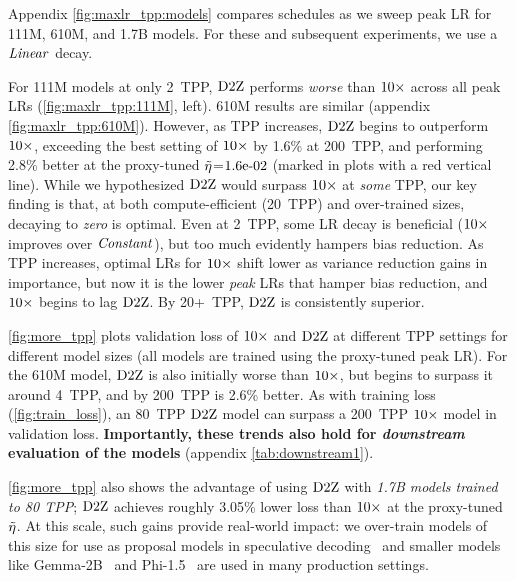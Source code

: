 Appendix \cref{fig:maxlr_tpp:models} compares schedules as we sweep
peak LR for 111M, 610M, and 1.7B models.  For these and subsequent
experiments, we use a $\mbox{\emph{Linear}}$ decay.



%


For 111M models at only 2~TPP, $\mbox{D2Z}$ performs \emph{worse} than
$\mbox{10}\times$ across all peak LRs (\cref{fig:maxlr_tpp:111M}, left).  610M
results are similar (appendix \cref{fig:maxlr_tpp:610M}).  However, as
TPP increases, $\mbox{D2Z}$ begins to outperform $\mbox{10}\times$, exceeding the
best setting of $\mbox{10}\times$ by 1.6\% at 200~TPP, and performing 2.8\%
better at the proxy-tuned $\tilde{\eta}$=$1.6\mbox{e-}02$ (marked in plots with a
red vertical line).
%
While we hypothesized $\mbox{D2Z}$ would surpass $\mbox{10}\times$ at \emph{some}
TPP, our key finding is that, at both compute-efficient (20~TPP) and
over-trained sizes, decaying to \emph{zero} is optimal.
%
Even at 2~TPP, some LR decay is beneficial ($\mbox{10}\times$ improves over
$\mbox{\emph{Constant}}$), but too much evidently hampers bias reduction.
%
As TPP increases, optimal LRs for $\mbox{10}\times$ shift lower as variance
reduction gains in importance, but now it is the lower \emph{peak} LRs
that hamper bias reduction, and $\mbox{10}\times$ begins to lag $\mbox{D2Z}$.
%
By 20+~TPP, $\mbox{D2Z}$ is consistently superior.
%
%

\cref{fig:more_tpp} plots validation loss of $\mbox{10}\times$ and $\mbox{D2Z}$ at
different TPP settings for different model sizes (all models are
trained using the proxy-tuned peak LR\@).
%
For the 610M model, $\mbox{D2Z}$ is also initially worse than $\mbox{10}\times$, but
begins to surpass it around 4~TPP, and by 200~TPP is 2.6\% better.  As
with training loss (\cref{fig:train_loss}), an 80~TPP $\mbox{D2Z}$
model can surpass a 200~TPP $\mbox{10}\times$ model in validation loss.
%
\textbf{Importantly, these trends also hold for \emph{downstream}
  evaluation of the models} (appendix \cref{tab:downstream1}).

\cref{fig:more_tpp} also shows the advantage of using $\mbox{D2Z}$ with
\emph{1.7B models trained to 80 TPP}\@; $\mbox{D2Z}$ achieves roughly
3.05\% lower loss than $\mbox{10}\times$ at the proxy-tuned $\tilde{\eta}$.  At this
scale, such gains provide real-world impact: we over-train models of
this size for use as proposal models in speculative
decoding~\citep{leviathan2023fast} and smaller models like
Gemma-2B~\citep{mesnard2024gemma} and Phi-1.5~\citep{li2023textbooks}
are used in many production settings.
%

